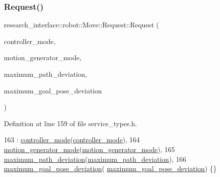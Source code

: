 \subsubsection{\texorpdfstring{Request()}{Request()}}
{\footnotesize\ttfamily research\+\_\+interface\+::robot\+::\+Move\+::\+Request\+::\+Request (\begin{DoxyParamCaption}\item[{\hyperlink{structresearch__interface_1_1robot_1_1Move_a3e7b80b30bbf01dc902c84402502ebbc}{Controller\+Mode}}]{controller\+\_\+mode,  }\item[{\hyperlink{structresearch__interface_1_1robot_1_1Move_a334b8380507154e8042b57fbd3287c0f}{Motion\+Generator\+Mode}}]{motion\+\_\+generator\+\_\+mode,  }\item[{const \hyperlink{structresearch__interface_1_1robot_1_1Move_1_1Deviation}{Deviation} \&}]{maximum\+\_\+path\+\_\+deviation,  }\item[{const \hyperlink{structresearch__interface_1_1robot_1_1Move_1_1Deviation}{Deviation} \&}]{maximum\+\_\+goal\+\_\+pose\+\_\+deviation }\end{DoxyParamCaption})\hspace{0.3cm}{\ttfamily [inline]}}



Definition at line 159 of file service\+\_\+types.\+h.


\begin{DoxyCode}
163         : \hyperlink{structresearch__interface_1_1robot_1_1Move_1_1Request_abdc9f396518796f92f722ba1d6d50861}{controller\_mode}(\hyperlink{structresearch__interface_1_1robot_1_1Move_1_1Request_abdc9f396518796f92f722ba1d6d50861}{controller\_mode}),
164           \hyperlink{structresearch__interface_1_1robot_1_1Move_1_1Request_a550736be5350d0987a133557a8757fd5}{motion\_generator\_mode}(\hyperlink{structresearch__interface_1_1robot_1_1Move_1_1Request_a550736be5350d0987a133557a8757fd5}{motion\_generator\_mode}),
165           \hyperlink{structresearch__interface_1_1robot_1_1Move_1_1Request_ace5bcd09768e2cba8ba1e4833d61927d}{maximum\_path\_deviation}(\hyperlink{structresearch__interface_1_1robot_1_1Move_1_1Request_ace5bcd09768e2cba8ba1e4833d61927d}{maximum\_path\_deviation}),
166           \hyperlink{structresearch__interface_1_1robot_1_1Move_1_1Request_af2afe598f4dde96a266c56e3cbfc9bd5}{maximum\_goal\_pose\_deviation}(
      \hyperlink{structresearch__interface_1_1robot_1_1Move_1_1Request_af2afe598f4dde96a266c56e3cbfc9bd5}{maximum\_goal\_pose\_deviation}) \{\}
\end{DoxyCode}


